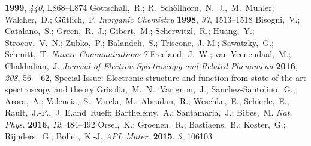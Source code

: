 \documentclass[aip,graphicx,numerical]{revtex4-1}
\begin{document}
\begin{mcitethebibliography}{33}
  \textbf{1999}, \emph{440}, L868--L874\relax
\mciteBstWouldAddEndPuncttrue
\mciteSetBstMidEndSepPunct{\mcitedefaultmidpunct}
{\mcitedefaultendpunct}{\mcitedefaultseppunct}\relax
\EndOfBibitem
{}
Gottschall,~R.; R.~Sch{\"{o}}llhorn,~N.~J.,~M.~Muhler; Walcher,~D.;
  G{\"{u}}tlich,~P. \emph{Inorganic Chemistry} \textbf{1998}, \emph{37},
  1513--1518\relax
\mciteBstWouldAddEndPuncttrue
\mciteSetBstMidEndSepPunct{\mcitedefaultmidpunct}
{\mcitedefaultendpunct}{\mcitedefaultseppunct}\relax
\EndOfBibitem
{}
Bisogni,~V.; Catalano,~S.; Green,~R.~J.; Gibert,~M.; Scherwitzl,~R.; Huang,~Y.;
  Strocov,~V.~N.; Zubko,~P.; Balandeh,~S.; Triscone,~J.-M.; Sawatzky,~G.;
  Schmitt,~T. \emph{Nature Communications} \emph{7}\relax
\mciteBstWouldAddEndPuncttrue
\mciteSetBstMidEndSepPunct{\mcitedefaultmidpunct}
{\mcitedefaultendpunct}{\mcitedefaultseppunct}\relax
\EndOfBibitem
{}
Freeland,~J.~W.; van Veenendaal,~M.; Chakhalian,~J. \emph{Journal of Electron
  Spectroscopy and Related Phenomena} \textbf{2016}, \emph{208}, 56 -- 62,
  Special Issue: Electronic structure and function from state-of-the-art
  spectroscopy and theory\relax
\mciteBstWouldAddEndPuncttrue
\mciteSetBstMidEndSepPunct{\mcitedefaultmidpunct}
{\mcitedefaultendpunct}{\mcitedefaultseppunct}\relax
\EndOfBibitem
{}
Grisolia,~M.~N.; Varignon,~J.; Sanchez-Santolino,~G.; Arora,~A.; Valencia,~S.;
  Varela,~M.; Abrudan,~R.; Weschke,~E.; Schierle,~E.; Rault,~J.-P.,~J.
  E.and~Rueff; Barthelemy,~A.; Santamaria,~J.; Bibes,~M. \emph{Nat. Phys.}
  \textbf{2016}, \emph{12}, 484--492\relax
\mciteBstWouldAddEndPuncttrue
\mciteSetBstMidEndSepPunct{\mcitedefaultmidpunct}
{\mcitedefaultendpunct}{\mcitedefaultseppunct}\relax
\EndOfBibitem
{}
Orsel,~K.; Groenen,~R.; Bastiaens,~B.; Koster,~G.; Rijnders,~G.; Boller,~K.-J.
  \emph{APL Mater.} \textbf{2015}, \emph{3}, 106103\relax
\mciteBstWouldAddEndPuncttrue
\mciteSetBstMidEndSepPunct{\mcitedefaultmidpunct}
{\mcitedefaultendpunct}{\mcitedefaultseppunct}\relax
\EndOfBibitem
\end{mcitethebibliography}
\end{document}

